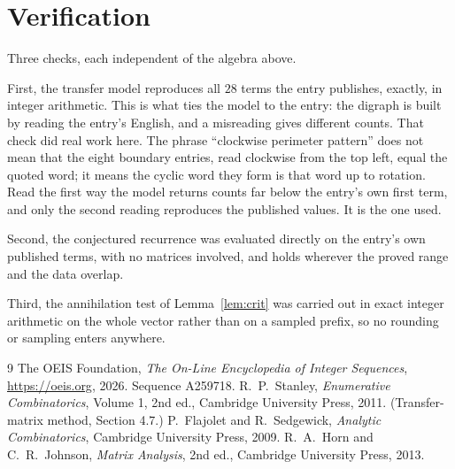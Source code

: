 \documentclass[11pt,a4paper]{article}
\theoremstyle{plain}
\theoremstyle{definition}
\begin{document}
\section{Verification}

Three checks, each independent of the algebra above.

First, the transfer model reproduces all $28$ terms the entry publishes, exactly, in
integer arithmetic. This is what ties the model to the entry: the digraph is built by reading
the entry's English, and a misreading gives different counts. That check did real work here. The phrase ``clockwise perimeter pattern'' does not mean that the eight boundary entries, read clockwise from the top left, equal the quoted word; it means the cyclic word they form is that word up to rotation. Read the first way the model returns counts far below the entry's own first term, and only the second reading reproduces the published values. It is the one used.

Second, the conjectured recurrence was evaluated directly on the entry's own published terms,
with no matrices involved, and holds wherever the proved range and the data overlap.

Third, the annihilation test of Lemma~\ref{lem:crit} was carried out in exact integer
arithmetic on the whole vector rather than on a sampled prefix, so no rounding or sampling
enters anywhere.

\begin{thebibliography}{9}
 The OEIS Foundation, \emph{The On-Line Encyclopedia of Integer
Sequences}, \url{https://oeis.org}, 2026. Sequence A259718.
 R.~P.~Stanley, \emph{Enumerative Combinatorics}, Volume 1, 2nd ed.,
Cambridge University Press, 2011. (Transfer-matrix method, Section 4.7.)
 P.~Flajolet and R.~Sedgewick, \emph{Analytic Combinatorics}, Cambridge
University Press, 2009.
 R.~A.~Horn and C.~R.~Johnson, \emph{Matrix Analysis}, 2nd ed., Cambridge
University Press, 2013.
\end{thebibliography}
\end{document}
